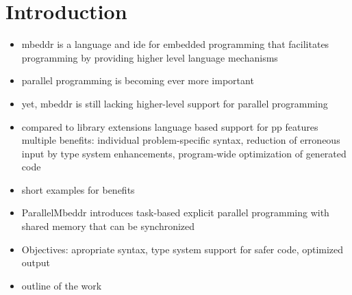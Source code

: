 \chapter{Introduction}

\begin{itemize}
\item mbeddr is a language and ide for embedded programming that facilitates programming by providing higher level language mechanisms
\item parallel programming is becoming ever more important
\item yet, mbeddr is still lacking higher-level support for parallel programming
\item compared to library extensions language based support for pp features multiple benefits: individual problem-specific syntax, reduction of erroneous input by type system enhancements, program-wide optimization of generated code
\item short examples for benefits
\item ParallelMbeddr introduces task-based explicit parallel programming with shared memory that can be synchronized
\item Objectives: apropriate syntax, type system support for safer code, optimized output
\item outline of the work
\end{itemize}

